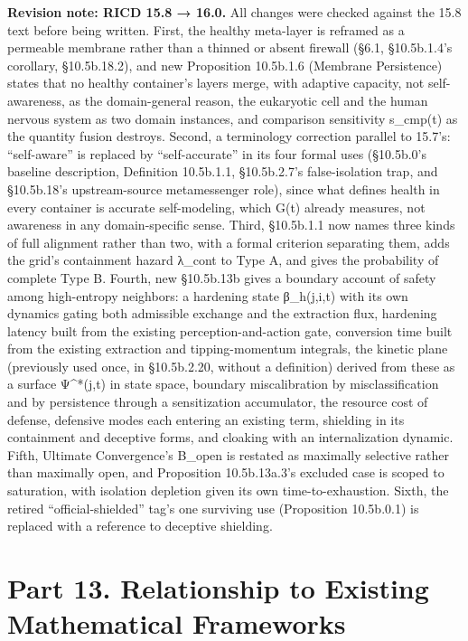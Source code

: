 \documentclass[
]{article}
\begin{document}
\textbf{Revision note: RICD 15.8 → 16.0.} All changes were checked
against the 15.8 text before being written. First, the healthy
meta-layer is reframed as a permeable membrane rather than a thinned or
absent firewall (§6.1, §10.5b.1.4's corollary, §10.5b.18.2), and new
Proposition 10.5b.1.6 (Membrane Persistence) states that no healthy
container's layers merge, with adaptive capacity, not self-awareness, as
the domain-general reason, the eukaryotic cell and the human nervous
system as two domain instances, and comparison sensitivity s\_cmp(t) as
the quantity fusion destroys. Second, a terminology correction parallel
to 15.7's: ``self-aware'' is replaced by ``self-accurate'' in its four
formal uses (§10.5b.0's baseline description, Definition 10.5b.1.1,
§10.5b.2.7's false-isolation trap, and §10.5b.18's upstream-source
metamessenger role), since what defines health in every container is
accurate self-modeling, which G(t) already measures, not awareness in
any domain-specific sense. Third, §10.5b.1.1 now names three kinds of
full alignment rather than two, with a formal criterion separating them,
adds the grid's containment hazard λ\_cont to Type A, and gives the
probability of complete Type B. Fourth, new §10.5b.13b gives a boundary
account of safety among high-entropy neighbors: a hardening state
β\_h(j,i,t) with its own dynamics gating both admissible exchange and the
extraction flux, hardening latency built from the existing
perception-and-action gate, conversion time built from the existing
extraction and tipping-momentum integrals, the kinetic plane (previously
used once, in §10.5b.2.20, without a definition) derived from these as
a surface Ψ\^{}*(j,t) in state space, boundary miscalibration by
misclassification and by persistence through a sensitization
accumulator, the resource cost of defense, defensive modes each entering
an existing term, shielding in its containment and deceptive forms, and
cloaking with an internalization dynamic. Fifth, Ultimate Convergence's
B\_open is restated as maximally selective rather than maximally open,
and Proposition 10.5b.13a.3's excluded case is scoped to saturation,
with isolation depletion given its own time-to-exhaustion. Sixth, the
retired ``official-shielded'' tag's one surviving use (Proposition
10.5b.0.1) is replaced with a reference to deceptive shielding.

\hypertarget{part-13.-relationship-to-existing-mathematical-frameworks}{%
\section{Part 13. Relationship to Existing Mathematical
Frameworks}\label{part-13.-relationship-to-existing-mathematical-frameworks}}
\end{document}
